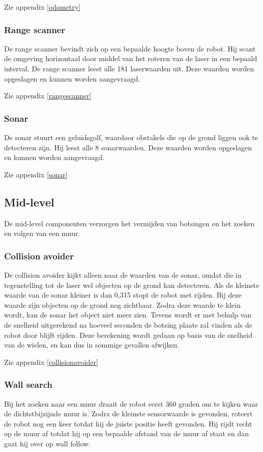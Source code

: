 \documentclass[a4paper,10pt]{article}
\begin{document}
Zie appendix \ref{odometry}

\subsubsection{Range scanner}
De range scanner bevindt zich op een bepaalde hoogte boven de robot. Hij scant de omgeving horizontaal door middel van het roteren van de laser in een bepaald interval. De range scanner leest alle 181 laserwaarden uit. Deze waarden worden opgeslagen en kunnen worden aangevraagd.

Zie appendix \ref{rangescanner}

\subsubsection{Sonar}
De sonar stuurt een geluidsgolf, waardoor obstakels die op de grond liggen ook te detecteren zijn. Hij leest alle 8 sonarwaarden. Deze waarden worden opgeslagen en kunnen worden aangevraagd.

Zie appendix \ref{sonar}

\subsection{Mid-level}
De mid-level componenten verzorgen het vermijden van botsingen en het zoeken en volgen van een muur.

\subsubsection{Collision avoider}
De collision avoider kijkt alleen naar de waarden van de sonar, omdat die in tegenstelling tot de laser wel objecten op de grond kan detecteren. Als de kleinste waarde van de sonar kleiner is dan 0,315 stopt de robot met rijden. Bij deze waarde zijn objecten op de grond nog zichtbaar. Zodra deze waarde te klein wordt, kan de sonar het object niet meer zien. Tevens wordt er met behulp van de snelheid uitgerekend na hoeveel seconden de botsing plaats zal vinden als de robot door blijft rijden. Deze berekening wordt gedaan op basis van de snelheid van de wielen, en kan dus in sommige gevallen afwijken.

Zie appendix \ref{collisionavoider}

\subsubsection{Wall search}
Bij het zoeken naar een muur draait de robot eerst 360 graden om te kijken waar de dichtstbijzijnde muur is. Zodra de kleinste sensorwaarde is gevonden, roteert de robot nog een keer totdat hij de juiste positie heeft gevonden. Hij rijdt recht op de muur af totdat hij op een bepaalde afstand van de muur af staat en dan gaat hij over op wall follow.
\end{document}
